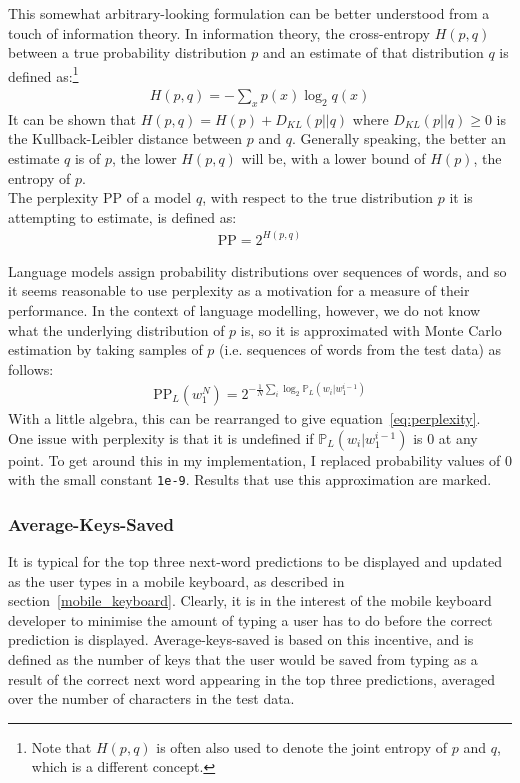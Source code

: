 \documentclass[a4paper, 12pt]{report}
\newcommand{\ttt}[1]{\texttt{#1}}
\begin{document}
This somewhat arbitrary-looking formulation can be better understood from a touch of information theory. In information theory, the cross-entropy $H(p, q)$ between a true probability distribution $p$ and an estimate of that distribution $q$ is defined as:\footnote{Note that $H(p, q)$ is often also used to denote the joint entropy of $p$ and $q$, which is a different concept.}
\begin{gather*}
	H(p, q) = -\sum_x p(x) \log_2 q(x)
\end{gather*}
It can be shown that $H(p, q) = H(p) + D_{KL}(p || q)$ where $D_{KL}(p || q) \geq 0$ is the Kullback-Leibler distance between $p$ and $q$. Generally speaking, the better an estimate $q$ is of $p$, the lower $H(p, q)$ will be, with a lower bound of $H(p)$, the entropy of $p$. \\

The perplexity PP of a model $q$, with respect to the true distribution $p$ it is attempting to estimate, is defined as:
\begin{gather} \label{eq:perplexity_to_cross_entropy}
	\text{PP} = 2^{H(p, q)}
\end{gather}

Language models assign probability distributions over sequences of words, and so it seems reasonable to use perplexity as a motivation for a measure of their performance. In the context of language modelling, however, we do not know what the underlying distribution of $p$ is, so it is approximated with Monte Carlo estimation by taking samples of $p$ (i.e. sequences of words from the test data) as follows:
\begin{gather*}
	\text{PP}_L(w_1^N) = 2^{-\frac{1}{N}\sum_i \log_2 \mathbb{P}_L(w_i | w_1^{i-1})}
\end{gather*}
With a little algebra, this can be rearranged to give equation~\ref{eq:perplexity}. \\

One issue with perplexity is that it is undefined if $\mathbb{P}_L(w_i | w_1^{i-1})$ is 0 at any point. To get around this in my implementation, I replaced probability values of 0 with the small constant \ttt{1e-9}. Results that use this approximation are marked.

\subsubsection{Average-Keys-Saved}

It is typical for the top three next-word predictions to be displayed and updated as the user types in a mobile keyboard, as described in section~\ref{mobile_keyboard}. Clearly, it is in the interest of the mobile keyboard developer to minimise the amount of typing a user has to do before the correct prediction is displayed. Average-keys-saved is based on this incentive, and is defined as the number of keys that the user would be saved from typing as a result of the correct next word appearing in the top three predictions, averaged over the number of characters in the test data. \\
\end{document}
